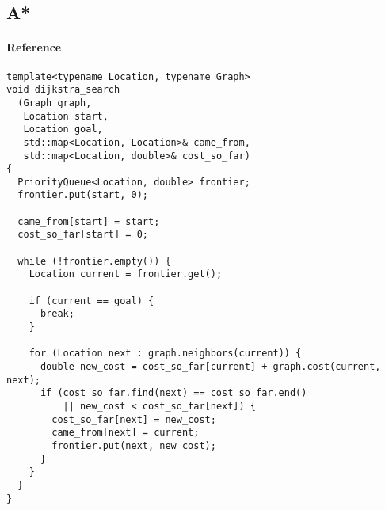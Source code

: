 \newpage
\subsection{A*}
\paragraph{Reference} \cite{Algorithm5}
\begin{lstlisting}
template<typename Location, typename Graph>
void dijkstra_search
  (Graph graph,
   Location start,
   Location goal,
   std::map<Location, Location>& came_from,
   std::map<Location, double>& cost_so_far)
{
  PriorityQueue<Location, double> frontier;
  frontier.put(start, 0);

  came_from[start] = start;
  cost_so_far[start] = 0;
  
  while (!frontier.empty()) {
    Location current = frontier.get();

    if (current == goal) {
      break;
    }

    for (Location next : graph.neighbors(current)) {
      double new_cost = cost_so_far[current] + graph.cost(current, next);
      if (cost_so_far.find(next) == cost_so_far.end()
          || new_cost < cost_so_far[next]) {
        cost_so_far[next] = new_cost;
        came_from[next] = current;
        frontier.put(next, new_cost);
      }
    }
  }
}
\end{lstlisting}